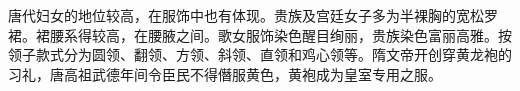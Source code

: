 唐代妇女的地位较高，在服饰中也有体现。贵族及宫廷女子多为半裸胸的宽松罗裙。裙腰系得较高，在腰腋之间。歌女服饰染色醒目绚丽，贵族染色富丽高雅。按领子款式分为圆领、翻领、方领、斜领、直领和鸡心领等。隋文帝开创穿黄龙袍的习礼，唐高祖武德年间令臣民不得僭服黄色，黄袍成为皇室专用之服。


























